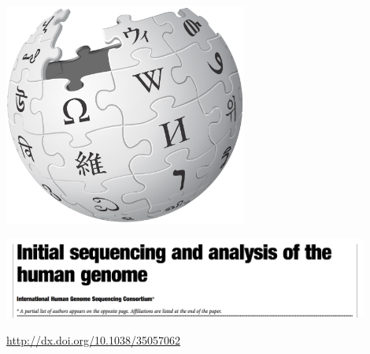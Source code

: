 \documentclass[aspectratio=169]{beamer}
\begin{document}
\begin{frame}
  \titlepage
\end{frame}
\begin{frame}

\begin{center}
\includegraphics[width=0.6\textwidth]{figures/wikipedia_logo}
\end{center}

\end{frame}
\begin{frame}

\begin{center}
\includegraphics[width=0.9\textwidth]{figures/lander_initial_2001_title}
\end{center}

\vfill
{\tiny \url{http://dx.doi.org/10.1038/35057062}}

\end{frame}
\end{document}
